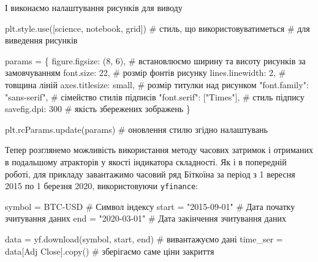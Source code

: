 \documentclass[
  letterpaper,
]{report}
\newenvironment{Shaded}{\begin{snugshade}}{\end{snugshade}}
\newcommand{\CommentTok}[1]{\textcolor[rgb]{0.37,0.37,0.37}{#1}}
\newcommand{\DecValTok}[1]{\textcolor[rgb]{0.68,0.00,0.00}{#1}}
\newcommand{\NormalTok}[1]{\textcolor[rgb]{0.00,0.23,0.31}{#1}}
\newcommand{\OperatorTok}[1]{\textcolor[rgb]{0.37,0.37,0.37}{#1}}
\newcommand{\StringTok}[1]{\textcolor[rgb]{0.13,0.47,0.30}{#1}}
\begin{document}
І виконаємо налаштування рисунків для виводу

\begin{Shaded}
\begin{Highlighting}[]
\NormalTok{plt.style.use([}\StringTok{\textquotesingle{}science\textquotesingle{}}\NormalTok{, }\StringTok{\textquotesingle{}notebook\textquotesingle{}}\NormalTok{, }\StringTok{\textquotesingle{}grid\textquotesingle{}}\NormalTok{]) }\CommentTok{\# стиль, що використовуватиметься}
                                               \CommentTok{\# для виведення рисунків}

\NormalTok{params }\OperatorTok{=}\NormalTok{ \{}
    \StringTok{\textquotesingle{}figure.figsize\textquotesingle{}}\NormalTok{: (}\DecValTok{8}\NormalTok{, }\DecValTok{6}\NormalTok{),         }\CommentTok{\# встановлюємо ширину та висоту рисунків за замовчуванням}
    \StringTok{\textquotesingle{}font.size\textquotesingle{}}\NormalTok{: }\DecValTok{22}\NormalTok{,                  }\CommentTok{\# розмір фонтів рисунку}
    \StringTok{\textquotesingle{}lines.linewidth\textquotesingle{}}\NormalTok{: }\DecValTok{2}\NormalTok{,             }\CommentTok{\# товщина ліній}
    \StringTok{\textquotesingle{}axes.titlesize\textquotesingle{}}\NormalTok{: }\StringTok{\textquotesingle{}small\textquotesingle{}}\NormalTok{,        }\CommentTok{\# розмір титулки над рисунком}
    \StringTok{"font.family"}\NormalTok{: }\StringTok{"sans{-}serif"}\NormalTok{,      }\CommentTok{\# сімейство стилів підписів }
    \StringTok{"font.serif"}\NormalTok{: [}\StringTok{"Times"}\NormalTok{],          }\CommentTok{\# стиль підпису}
    \StringTok{\textquotesingle{}savefig.dpi\textquotesingle{}}\NormalTok{: }\DecValTok{300}                \CommentTok{\# якість збережених зображень}
\NormalTok{\}}

\NormalTok{plt.rcParams.update(params)           }\CommentTok{\# оновлення стилю згідно налаштувань}
\end{Highlighting}
\end{Shaded}

Тепер розглянемо можливість використання методу часових затримок і
отриманих в подальшому атракторів у якості індикатора складності. Як і в
попередній роботі, для прикладу завантажимо часовий ряд Біткоїна за
період з 1 вересня 2015 по 1 березня 2020, використовуючи
\texttt{yfinance}:

\begin{Shaded}
\begin{Highlighting}[]
\NormalTok{symbol }\OperatorTok{=} \StringTok{\textquotesingle{}BTC{-}USD\textquotesingle{}}       \CommentTok{\# Символ індексу}
\NormalTok{start }\OperatorTok{=} \StringTok{"2015{-}09{-}01"}     \CommentTok{\# Дата початку зчитування даних}
\NormalTok{end }\OperatorTok{=} \StringTok{"2020{-}03{-}01"}       \CommentTok{\# Дата закінчення зчитування даних}

\NormalTok{data }\OperatorTok{=}\NormalTok{ yf.download(symbol, start, end)  }\CommentTok{\# вивантажуємо дані}
\NormalTok{time\_ser }\OperatorTok{=}\NormalTok{ data[}\StringTok{\textquotesingle{}Adj Close\textquotesingle{}}\NormalTok{].copy()     }\CommentTok{\# зберігаємо саме ціни закриття}
\end{Highlighting}
\end{Shaded}
\end{document}
